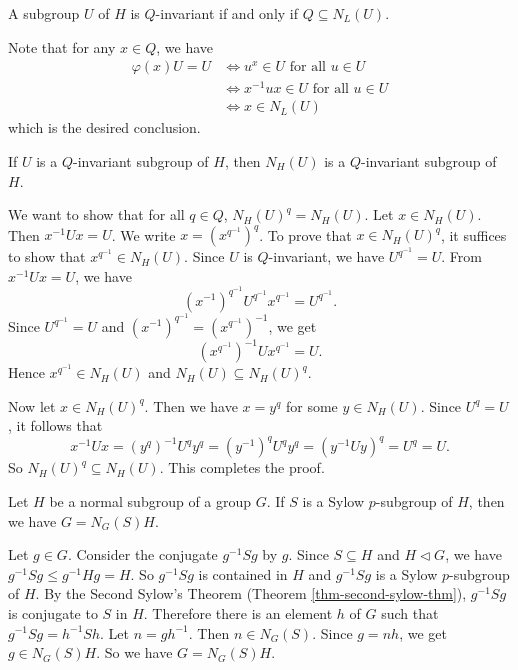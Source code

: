 \begin{lemma} \label{lemma-operator-group-invariant-eqv}
	A subgroup $U$ of $H$ is $Q$-invariant if and only if $Q \subseteq N_L(U)$.
\end{lemma}
\begin{sketch}
	Note that for any $x\in Q$, we have
	\begin{align*}
		\varphi(x) U = U &\iff u^x \in U \text{ for all } u\in U
		\\
		&\iff x^{-1}ux\in U \text{ for all } u\in U
		\\
		&\iff x\in N_L(U)
	\end{align*}
	which is the desired conclusion.
\end{sketch}
\begin{lemma} \label{lemma-invariant-implies-invariant-normalizer}
	If $U$ is a $Q$-invariant subgroup of $H$, then $N_H(U)$ is a $Q$-invariant subgroup of $H$.
\end{lemma}
\begin{sketch}
	We want to show that for all $q\in Q$, $N_H(U)^q = N_H(U)$. Let $x\in N_H(U)$.  Then $x^{-1}Ux = U$. We write  $
		x = (x^{q^{-1}})^q$. To prove that $x\in N_H(U)^q$, it suffices to show that $x^{q^{-1}} \in N_H(U)$. Since $U$ is $Q$-invariant, we have $U^{q^{-1}} = U$. From $x^{-1}Ux = U$, we have $$(x^{-1})^{q^{-1}}U^{q^{-1}}x^{q^{-1}} = U^{q^{-1}}.$$
		Since $U^{q^{-1}} = U$ and $(x^{-1})^{q^{-1}} = (x^{q^{-1}})^{-1}$, we get 
		\begin{equation*}
			(x^{q^{-1}})^{-1}Ux^{q^{-1}} = U.
		\end{equation*}
		Hence $x^{q^{-1}}\in N_H(U)$ and $N_H(U)\subseteq N_H(U)^q$. 
		
		Now let $x\in N_H(U)^q$. Then we have $x = y^q$ for some $y\in N_H(U)$. Since $U^q = U$, it follows that
		\begin{equation*}
			x^{-1}U x= (y^q)^{-1} U^qy^q= (y^{-1})^qU^qy^q = (y^{-1}Uy)^q = U^q = U.
		\end{equation*}
		So $N_H(U)^q\subseteq N_H(U)$. This completes the proof.
\end{sketch}
\begin{lemma} \label{lemma-G=N_G(S)H}
	Let $H$ be a normal subgroup of a group $G$. If $S$ is a Sylow $p$-subgroup of $H$, then we have $G = N_G(S)H$.
\end{lemma}
\begin{sketch}
	Let $g\in G$. Consider the conjugate $g^{-1}Sg$ by $g$. Since $S \subseteq H$ and $H\lhd G$, we have $g^{-1}Sg \leq g^{-1}Hg = H$. So $g^{-1}Sg$ is contained in $H$ and $g^{-1}Sg$ is a Sylow $p$-subgroup of $H$. By the Second Sylow's Theorem (Theorem \ref{thm-second-sylow-thm}), $g^{-1}Sg$ is conjugate to $S$ in $H$. Therefore there is an element $h$ of $G$ such that $g^{-1}Sg = h^{-1}Sh$. Let $n = gh^{-1}$. Then  $n \in N_G(S)$. Since $g = nh$, we get $g \in N_G(S)H$. So we have $G = N_G(S)H$.
\end{sketch} 
